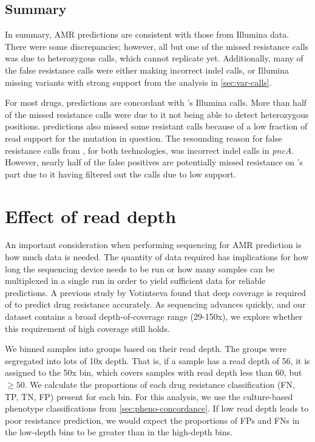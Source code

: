 \subsection{Summary}

In summary, \mykrobe{} \ont{} AMR predictions are consistent with those from Illumina data. There were some discrepancies; however, all but one of the missed resistance calls was due to heterozygous calls, which \ont{} cannot replicate yet. Additionally, many of the false resistance calls were either \ont{} making incorrect indel calls, or Illumina missing variants with strong support from the analysis in \autoref{sec:var-calls}.

For most drugs, \drprg{} predictions are concordant with \mykrobe{}'s Illumina calls. More than half of the \drprg{} missed resistance calls were due to it not being able to detect heterozygous positions. \drprg{} \ont{} predictions also missed some resistant calls because of a low fraction of read support for the mutation in question. The resounding reason for false resistance calls from \drprg{}, for both technologies, was incorrect indel calls in \textit{pncA}. However, nearly half of the \drprg{} false positives are potentially missed resistance on \mykrobe{}'s part due to it having filtered out the calls due to low support. 

\section{Effect of \ont{} read depth}
\label{sec:dst-covg}

An important consideration when performing \ont{} sequencing for AMR prediction is how much data is needed. The quantity of data required has implications for how long the \ont{} sequencing device needs to be run or how many samples can be multiplexed in a single run in order to yield sufficient data for reliable predictions. A previous study by Votintseva \etal{} found that deep coverage is required of \ont{} to predict drug resistance accurately\cite{Votintseva2017}. As \ont{} sequencing advances quickly, and our dataset contains a broad \ont{} depth-of-coverage range (29-150x), we explore whether this requirement of high coverage still holds. 

We binned samples into groups based on their read depth. The groups were segregated into lots of 10x depth. That is, if a sample has a read depth of 56, it is assigned to the 50x bin, which covers samples with read depth less than 60, but $\ge50$. We calculate the proportions of each drug resistance classification (FN, TP, TN, FP) present for each bin. For this analysis, we use the culture-based phenotype classifications from \autoref{sec:pheno-concordance}. If low read depth leads to poor resistance prediction, we would expect the proportions of FPs and FNs in the low-depth bins to be greater than in the high-depth bins. 


